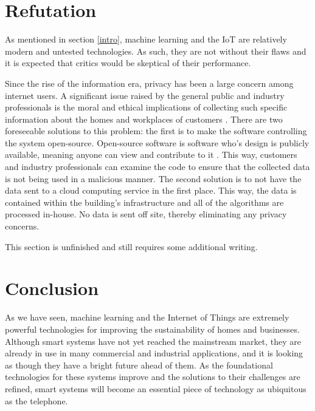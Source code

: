 \documentclass[letterpaper]{article}
\begin{document}
\section{Refutation} \label{refute}
As mentioned in section \ref{intro}, machine learning and the IoT are relatively modern and untested technologies. As such, they are not without their flaws and it is expected that critics would be skeptical of their performance. \par

Since the rise of the information era, privacy has been a large concern among internet users. A significant issue raised by the general public and industry professionals is the moral and ethical implications of collecting such specific information about the homes and workplaces of customers \cite{perisic16, mccalman17}. There are two foreseeable solutions to this problem: the first is to make the software controlling the system open-source. Open-source software is software who's design is publicly available, meaning anyone can view and contribute to it \cite{opensource}. This way, customers and industry professionals can examine the code to ensure that the collected data is not being used in a malicious manner. The second solution is to not have the data sent to a cloud computing service in the first place. This way, the data is contained within the building's infrastructure and all of the algorithms are processed in-house. No data is sent off site, thereby eliminating any privacy concerns. \par

This section is unfinished and still requires some additional writing.

\section{Conclusion} \label{conc}
As we have seen, machine learning and the Internet of Things are extremely powerful technologies for improving the sustainability of homes and businesses. Although smart systems have not yet reached the mainstream market, they are already in use in many commercial and industrial applications, and it is looking as though they have a bright future ahead of them. As the foundational technologies for these systems improve and the solutions to their challenges are refined, smart systems will become an essential piece of technology as ubiquitous as the telephone. 

\clearpage
\printbibliography
\end{document}
